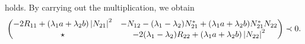 holds. By carrying out the multiplication, we obtain 
\[
\begin{pmatrix}
-2R_{11} + (\lambda_1 a+\lambda_2 b)\displaystyle \left|N_{21}\right|^2 & -N_{12} -(\lambda_1 -\lambda_2)N_{21}^*+(\lambda_1 a+\lambda_2 b)N_{21}^*N_{22}\\
\star                                              &-2(\lambda_1 -\lambda_2)R_{22}+(\lambda_1 a+\lambda_2 b)\displaystyle \left|N_{22}\right|^2
\end{pmatrix}\prec 0.
\]


